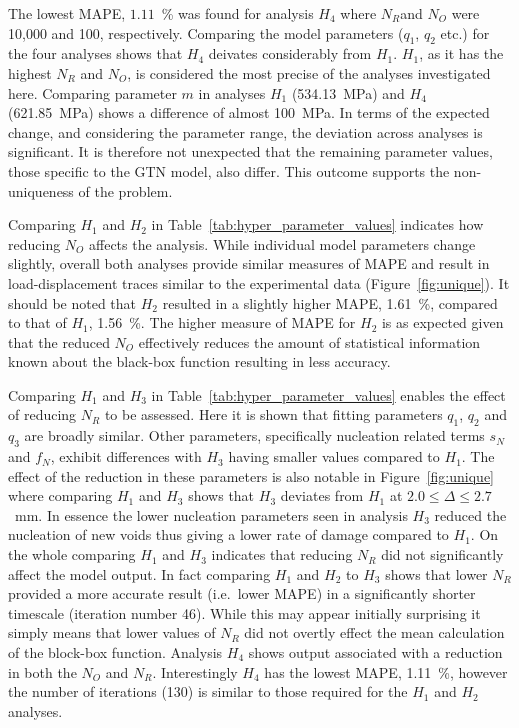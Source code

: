 \documentclass[preprint, review, 12pt]{elsarticle}
\begin{document}
	The lowest MAPE, $1.11$~\% was found for analysis $H_4$ where $N_R$and $N_O$ were 10,000 and 100, respectively.
	Comparing the model parameters ($q_1$, $q_2$ etc.) for the four analyses shows that $H_4$ deivates considerably from $H_1$.
	$H_1$, as it has the highest $N_R$ and $N_O$, is considered the most precise of the analyses investigated here.
	Comparing parameter $m$ in analyses $H_1$ (534.13~MPa) and $H_4$ (621.85~MPa) shows a difference of almost 100~MPa.
	In terms of the expected change, and considering the parameter range, the deviation across analyses is significant.
	It is therefore not unexpected that the remaining parameter values, those specific to the GTN model, also differ.
	This outcome supports the non-uniqueness of the problem.

	Comparing $H_1$ and $H_2$ in Table~\ref{tab:hyper_parameter_values} indicates how reducing $N_O$ affects the analysis.
	While individual model parameters change slightly, overall both analyses provide similar measures of MAPE and result in load-displacement traces similar to the experimental data (Figure~\ref{fig:unique}).
	It should be noted that $H_2$ resulted in a slightly higher MAPE, 1.61~\%, compared to that of $H_1$, 1.56~\%.
	The higher measure of MAPE for $H_2$ is as expected given that the reduced $N_O$ effectively reduces the amount of statistical information known about the black-box function resulting in less accuracy.

	Comparing $H_1$ and $H_3$ in Table~\ref{tab:hyper_parameter_values} enables the effect of reducing $N_R$ to be assessed.
	Here it is shown that fitting parameters $q_1$, $q_2$ and $q_3$ are broadly similar.
	Other parameters, specifically nucleation related terms $s_N$ and $f_N$, exhibit differences with $H_3$ having smaller values compared to $H_1$.
	The effect of the reduction in these parameters is also notable in Figure~\ref{fig:unique} where comparing $H_1$ and $H_3$ shows that $H_3$ deviates from $H_1$ at $2.0 \leq \Delta \leq 2.7$~mm.
	In essence the lower nucleation parameters seen in analysis $H_3$ reduced the nucleation of new voids thus giving a lower rate of damage compared to $H_1$.
	On the whole comparing $H_1$ and $H_3$ indicates that reducing $N_R$ did not significantly affect the model output.
	In fact comparing $H_1$ and $H_2$ to $H_3$ shows that lower $N_R$ provided a more accurate result (i.e.\ lower MAPE) in a significantly shorter timescale (iteration number 46).
	While this may appear initially surprising it simply means that lower values of $N_R$ did not overtly effect the mean calculation of the block-box function.
	Analysis $H_4$ shows output associated with a reduction in both the $N_O$ and $N_R$.
	Interestingly $H_4$ has the lowest MAPE, 1.11~\%, however the number of iterations (130) is similar to those required for the $H_1$ and $H_2$ analyses.
\end{document}
